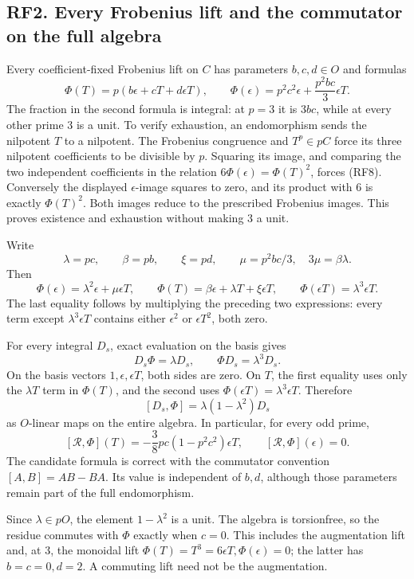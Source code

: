 \documentclass[
]{article}
\begin{document}
\subsection{RF2. Every Frobenius lift and the commutator on the full
algebra}\label{rf2.-every-frobenius-lift-and-the-commutator-on-the-full-algebra}

Every coefficient-fixed Frobenius lift on \(C\) has parameters
\(b,c,d\in O\) and formulas \[
\Phi(T)=p(b\epsilon+cT+d\epsilon T),\qquad
\Phi(\epsilon)=p^2c^2\epsilon+\frac{p^2bc}{3}\epsilon T.
\tag{RF8}
\] The fraction in the second formula is integral: at \(p=3\) it is
\(3bc\), while at every other prime 3 is a unit. To verify exhaustion,
an endomorphism sends the nilpotent \(T\) to a nilpotent. The Frobenius
congruence and \(T^p\in pC\) force its three nilpotent coefficients to
be divisible by \(p\). Squaring its image, and comparing the two
independent coefficients in the relation \(6\Phi(\epsilon)=\Phi(T)^2\),
forces (RF8). Conversely the displayed \(\epsilon\)-image squares to
zero, and its product with 6 is exactly \(\Phi(T)^2\). Both images
reduce to the prescribed Frobenius images. This proves existence and
exhaustion without making 3 a unit.

Write \[
\lambda=pc,\qquad \beta=pb,\qquad \xi=pd,\qquad
\mu=p^2bc/3,
\quad 3\mu=\beta\lambda.
\] Then \[
\Phi(\epsilon)=\lambda^2\epsilon+\mu\epsilon T,\qquad
\Phi(T)=\beta\epsilon+\lambda T+\xi\epsilon T,\qquad
\Phi(\epsilon T)=\lambda^3\epsilon T.
\tag{RF9}
\] The last equality follows by multiplying the preceding two
expressions: every term except \(\lambda^3\epsilon T\) contains either
\(\epsilon^2\) or \(\epsilon T^2\), both zero.

For every integral \(D_s\), exact evaluation on the basis gives \[
D_s\Phi=\lambda D_s,\qquad
\Phi D_s=\lambda^3D_s.
\tag{RF10}
\] On the basis vectors \(1,\epsilon,\epsilon T\), both sides are zero.
On \(T\), the first equality uses only the \(\lambda T\) term in
\(\Phi(T)\), and the second uses
\(\Phi(\epsilon T)=\lambda^3\epsilon T\). Therefore \[
[D_s,\Phi]=\lambda(1-\lambda^2)D_s
\tag{RF11}
\] as \(O\)-linear maps on the entire algebra. In particular, for every
odd prime, \[
[\mathcal R,\Phi](T)
=-\frac38pc(1-p^2c^2)\epsilon T,\qquad
[\mathcal R,\Phi](\epsilon)=0.
\tag{RF12}
\] The candidate formula is correct with the commutator convention
\([A,B]=AB-BA\). Its value is independent of \(b,d\), although those
parameters remain part of the full endomorphism.

Since \(\lambda\in pO\), the element \(1-\lambda^2\) is a unit. The
algebra is torsionfree, so the residue commutes with \(\Phi\) exactly
when \(c=0\). This includes the augmentation lift and, at 3, the
monoidal lift \(\Phi(T)=T^3=6\epsilon T,\Phi(\epsilon)=0\); the latter
has \(b=c=0,d=2\). A commuting lift need not be the augmentation.
\end{document}
